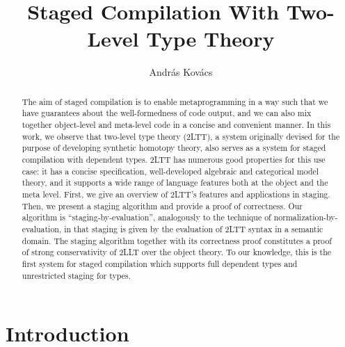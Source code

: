 \documentclass[acmsmall]{acmart}
\theoremstyle{remark}
\begin{document}
\title{Staged Compilation With Two-Level Type Theory}

\author{András Kovács}

\begin{abstract}
  The aim of staged compilation is to enable metaprogramming in a way such that
  we have guarantees about the well-formedness of code output, and we can also
  mix together object-level and meta-level code in a concise and convenient
  manner. In this work, we observe that two-level type theory (2LTT), a system
  originally devised for the purpose of developing synthetic homotopy theory,
  also serves as a system for staged compilation with dependent types. 2LTT has
  numerous good properties for this use case: it has a concise specification,
  well-developed algebraic and categorical model theory, and it supports a wide
  range of language features both at the object and the meta level. First, we
  give an overview of 2LTT's features and applications in staging. Then, we
  present a staging algorithm and provide a proof of correctness. Our algorithm
  is ``staging-by-evaluation'', analogously to the technique of
  normalization-by-evaluation, in that staging is given by the evaluation of
  2LTT syntax in a semantic domain. The staging algorithm together with its
  correctness proof constitutes a proof of strong conservativity of 2LLT over
  the object theory. To our knowledge, this is the first system for staged
  compilation which supports full dependent types and unrestricted staging for
  types.
\end{abstract}

\begin{CCSXML}
\end{CCSXML}

\maketitle

\section{Introduction}
\end{document}
